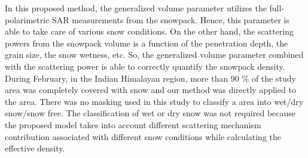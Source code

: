 In this proposed method, the generalized volume parameter utilizes the full-polarimetric SAR measurements from the snowpack. Hence, this parameter is able to take care of various snow conditions. On the other hand, the scattering powers from the snowpack volume is a function of the penetration depth, the grain size, the snow wetness, etc. So, the generalized volume parameter combined with the scattering power is able to correctly quantify the snowpack density. During February, in the Indian Himalayan region, more than 90 $\%$ of the study area was completely covered with snow and our method was directly applied to the area. There was no masking used in this study to classify a area into wet/dry snow/snow free. The classification of wet or dry snow was not required because the proposed model takes into account different scattering mechanism contribution associated with different snow conditions while calculating the effective density.